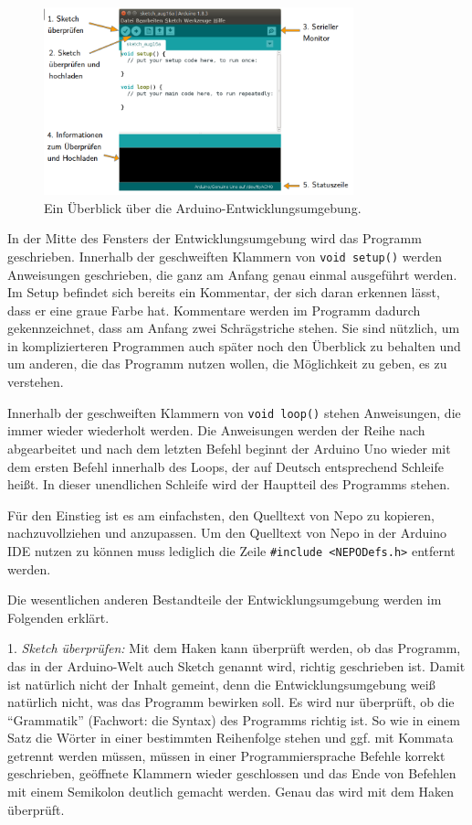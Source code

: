 \begin{figure}[H]
	\centering
	\includegraphics[width=0.8\textwidth]{pics/ide-ueberblick.png}
	\caption{Ein Überblick über die Arduino-Entwicklungsumgebung.}
	\label{abb:ide}
\end{figure}

In der Mitte des Fensters der Entwicklungsumgebung wird das Programm geschrieben. Innerhalb der geschweiften Klammern von \texttt{void setup()} werden Anweisungen geschrieben, die ganz am Anfang genau einmal ausgeführt werden. Im Setup befindet sich bereits ein Kommentar, der sich daran erkennen lässt, dass er eine graue Farbe hat. Kommentare werden im Programm dadurch gekennzeichnet, dass am Anfang zwei Schrägstriche stehen. Sie sind nützlich, um in komplizierteren Programmen auch später noch den Überblick zu behalten und um anderen, die das Programm nutzen wollen, die Möglichkeit zu geben, es zu verstehen.

Innerhalb der geschweiften Klammern von \texttt{void loop()} stehen Anweisungen, die immer wieder wiederholt werden. Die Anweisungen werden der Reihe nach abgearbeitet und nach dem letzten Befehl beginnt der Arduino Uno wieder mit dem ersten Befehl innerhalb des Loops, der auf Deutsch entsprechend Schleife heißt. In dieser unendlichen Schleife wird der Hauptteil des Programms stehen.

\medskip
\ausrufezeichen Für den Einstieg ist es am einfachsten, den Quelltext von Nepo zu kopieren, nachzuvollziehen und anzupassen. Um den Quelltext von Nepo in der Arduino IDE nutzen zu können muss lediglich die Zeile \texttt{\#include <NEPODefs.h>} entfernt werden.

\medskip

Die wesentlichen anderen Bestandteile der Entwicklungsumgebung werden im Folgenden erklärt.

1. \emph{Sketch überprüfen:} Mit dem Haken kann überprüft werden, ob das Programm, das in der Arduino-Welt auch Sketch genannt wird, richtig geschrieben ist. Damit ist natürlich nicht der Inhalt gemeint, denn die Entwicklungsumgebung weiß natürlich nicht, was das Programm bewirken soll. Es wird nur überprüft, ob die \enquote{Grammatik} (Fachwort: die Syntax) des Programms richtig ist. So wie in einem Satz die Wörter in einer bestimmten Reihenfolge stehen und ggf. mit Kommata getrennt werden müssen, müssen in einer Programmiersprache Befehle korrekt geschrieben, geöffnete Klammern wieder geschlossen und das Ende von Befehlen mit einem Semikolon deutlich gemacht werden. Genau das wird mit dem Haken überprüft.

